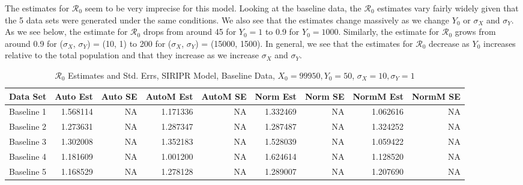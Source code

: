 \documentclass[12pt]{article}
\newcommand{\rr}{\ensuremath{\mathcal{R}_0}}
\begin{document}
The estimates for $\rr$ seem to be very imprecise for this model. Looking at the baseline data, the $\rr$ estimates vary fairly widely given that the 5 data sets were generated under the same conditions. We also see that the estimates change massively as we change $Y_0$ or $\sigma_X$ and $\sigma_Y$. As we see below, the estimate for $\rr$ drops from around 45 for $Y_0 = 1$ to 0.9 for $Y_0 = 1000$. Similarly, the estimate for $\rr$ grows from around 0.9 for ($\sigma_X$, $\sigma_Y$) = (10, 1) to 200 for ($\sigma_X$, $\sigma_Y$) = (15000, 1500). In general, we see that the estimates for $\rr$ decrease as $Y_0$ increases relative to the total population and that they increase as we increase 
$\sigma_X$ and $\sigma_Y$.

\begin{table}[H]
	
	\caption{$\rr$ Estimates and Std. Errs, SIRIPR Model,
		Baseline Data, $X_0 = 99950, Y_0 = 50$, 
		$\sigma_X = 10, \sigma_Y = 1$}
	\begin{footnotesize}
		\hskip -1cm
		\begin{tabular}{l|r|r|r|r|r|r|r|r}
			\hline
			Data Set & Auto Est & Auto SE & AutoM Est & AutoM SE & Norm Est & Norm SE & NormM Est & NormM SE\\
			\hline
			Baseline 1 & 1.568114 & NA & 1.171336 & NA & 1.332469 & NA & 1.062616 & NA\\
			\hline
			Baseline 2 & 1.273631 & NA & 1.287347 & NA & 1.287487 & NA & 1.324252 & NA\\
			\hline
			Baseline 3 & 1.302008 & NA & 1.352183 & NA & 1.528039 & NA & 1.059422 & NA\\
			\hline
			Baseline 4 & 1.181609 & NA & 1.001200 & NA & 1.624614 & NA & 1.128520 & NA\\
			\hline
			Baseline 5 & 1.168529 & NA & 1.278128 & NA & 1.289007 & NA & 1.207690 & NA\\
			\hline
		\end{tabular}
	\end{footnotesize}
\end{table}
\end{document}
